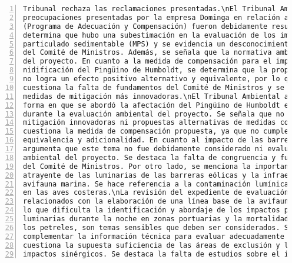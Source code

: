 \begin{Verbatim}[frame=lines, label=Elavoración propia -  Ejemplo de Contexto enviado por el Chatbot a OpenAI
				, fontsize=\scriptsize, numbers=left
				, baselinestretch=0.4
				, formatcom=\color{gray}]
Tribunal rechaza las reclamaciones presentadas.\nEl Tribunal Ambiental concluye que las
preocupaciones presentadas por la empresa Dominga en relación a las preocupaciones PAC
(Programa de Adecuación y Compensación) fueron debidamente resueltas. Sin embargo, se
determina que hubo una subestimación en la evaluación de los impactos por aporte de material
particulado sedimentable (MPS) y se evidencia un desconocimiento de los antecedentes por parte
del Comité de Ministros. Además, se señala que la normativa ambiental no se adecúa al contexto
del proyecto. En cuanto a la medida de compensación para el impacto en el proceso de
nidificación del Pingüino de Humboldt, se determina que la propuesta presentada por la empresa
no logra un efecto positivo alternativo y equivalente, por lo que se acoge la reclamación. Se
cuestiona la falta de fundamentos del Comité de Ministros y se sugiere la implementación de
medidas de mitigación más innovadoras.\nEl Tribunal Ambiental advierte una debilidad en la
forma en que se abordó la afectación del Pingüino de Humboldt en el islote Totoralillo Norte
durante la evaluación ambiental del proyecto. Se señala que no se consideraron medidas de
mitigación innovadoras ni propuestas alternativas de medidas compensatorias. Además, se
cuestiona la medida de compensación propuesta, ya que no cumple con los requisitos de
equivalencia y adicionalidad. En cuanto al impacto de las barreras eólicas en la avifauna, se
argumenta que este tema no fue debidamente considerado ni evaluado durante la evaluación
ambiental del proyecto. Se destaca la falta de congruencia y fundamentación en la resolución
del Comité de Ministros. Por otro lado, se menciona la importancia de evaluar el efecto
atrayente de las luminarias de las barreras eólicas y la infraestructura portuaria en la
avifauna marina. Se hace referencia a la contaminación lumínica y sus efectos desorientadores
en las aves costeras.\nLa revisión del expediente de evaluación ambiental no muestra estudios
relacionados con la elaboración de una línea base de la avifauna en los sectores mencionados,
lo que dificulta la identificación y abordaje de los impactos potenciales. El uso de
luminarias durante la noche en zonas portuarias y la mortalidad de aves marinas, especialmente
los petreles, son temas sensibles que deben ser considerados. Se advierte la oportunidad de
complementar la información técnica para evaluar adecuadamente estos impactos. Además, se
cuestiona la supuesta suficiencia de las áreas de exclusión y la falta de consideración de los
impactos sinérgicos. Se destaca la falta de estudios sobre el impacto acústico de los buques

\end{Verbatim}
